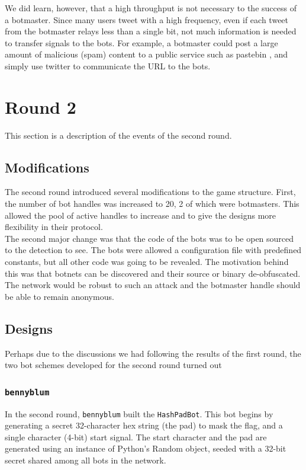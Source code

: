 \documentclass[11pt, oneside]{article} %
\numberwithin{equation}{section} %
\numberwithin{figure}{section} %
\numberwithin{table}{section} %
\renewcommand{\c}[1]{\texttt{#1}}
\newcommand{\teambb}{\c{bennyblum}}
\begin{document}
		We did learn, however, that a high throughput is not necessary to the success of a botmaster. Since many users tweet with a high frequency, even if each tweet from the botmaster relays less than a single bit, not much information is needed to transfer signals to the bots. For example, a botmaster could post a large amount of malicious (spam) content to a public service such as pastebin \cite{pastebin}, and simply use twitter to communicate the URL to the bots. \\


\section{Round 2}
	This section is a description of the events of the second round.

	\subsection{Modifications}
		The second round introduced several modifications to the game structure. First, the number of bot handles was increased to 20, 2 of which were botmasters. This allowed the pool of active handles to increase and to give the designs more flexibility in their protocol. \\

		The second major change was that the code of the bots was to be open sourced to the detection to see. The bots were allowed a configuration file with predefined constants, but all other code was going to be revealed. The motivation behind this was that botnets can be discovered and their source or binary de-obfuscated. The network would be robust to such an attack and the botmaster handle should be able to remain anonymous. \\

		
	\subsection{Designs}
        Perhaps due to the discussions we had following the results of the first round, the two bot schemes developed for the second round turned out 
		\subsubsection{\teambb{}}
        	In the second round, \teambb{} built the \c{HashPadBot}. This bot begins by generating a secret 32-character hex string (the pad) to mask the flag, and a single character (4-bit) start signal. The start character and the pad are generated using an instance of Python's Random object, seeded with a 32-bit secret shared among all bots in the network.
        	
\end{document}
